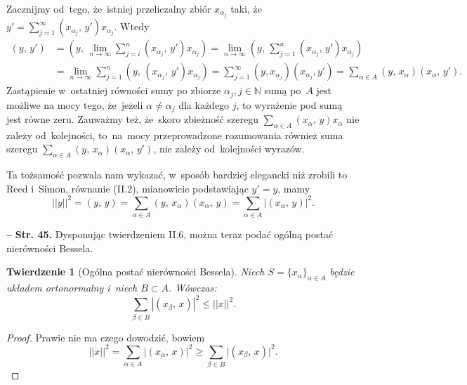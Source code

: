 \documentclass[a4paper,11pt]{article}
\newtheorem{twr}{Twierdzenie}
\newcommand{\spaceFour}{0.5em}
\newcommand{\mb}{\mathbb}
\newcommand{\ra}{\rightarrow}
\newcommand{\al}{\alpha}
\newcommand{\be}{\beta}
\newcommand{\N}{\mb{N}}
\newcommand{\subs}{\subset}
\newcommand{\Lim}{\lim\limits}
\newcommand{\Sum}{\sum\limits}
\providecommand{\absj}[1]{\lvert #1 \rvert}
\providecommand{\absd}[1]{\left| #1 \right|}
\providecommand{\absd}[1]{\left| \, #1 \, \right|}
\newcommand{\norm}[1]{\left|\left| #1 \right|\right|}
\newcommand{\tb}{\textbf}
\newcommand{\noi}{\noindent}
\newcommand{\start}{\noi \tb{--} {}}
\newcommand{\Str}[1]{\tb{Str. #1.}}
\newcommand{\SP}[2]{( #1, \, #2 )} %
\begin{document}
Zacznijmy od~tego, że~istniej przeliczalny zbiór $x_{ \al_{ j } }$
taki,
że~$y' = \Sum_{ j = 1 }^{ \infty } \SP{ x_{ \al_{ j } } }{ y' } x_{
  \al_{ j } }$. Wtedy
\begin{equation*}
  \begin{split}
    \SP{ y }{ y' } &= \SP{ y }{ \Lim_{ n \ra \infty } \Sum_{ j = i }^{
        n } \SP{ x_{ \al_{ j } } }{ y' } x_{ \al_{ j } } } = \Lim_{ n
      \ra \infty } \SP{ y }{ \Sum_{ j = 1 }^{ n } \SP{ x_{ \al_{ j } }
      }
      { y' } x_{ \al_{ j } } } \\
    &= \Lim_{ n \ra \infty } \Sum_{ j = 1 }^{ n } \SP{ y }{ \SP{ x_{
          \al_{ j } } }{ y' } x_{ \al_{ j } } } = \sum_{ j = 1 }^{
      \infty } ( y, x_{ \al_{ j } } ) ( x_{ \al_{ j } }, y' ) = \Sum_{
      \al \in A } \SP{ y }{ x_{ \al } } \SP{ x_{ \al } }{ y' }.
  \end{split}
\end{equation*}
Zastąpienie w~ostatniej równości sumy po zbiorze
$\alpha_{ j }, j \in \N$ sumą po~$A$ jest możliwe na mocy tego,
że~jeżeli $\alpha \neq \alpha_{ j }$ dla każdego $j$, to wyrażenie pod
sumą jest równe zeru. Zauważmy też, że~skoro zbieżność szeregu
$\sum_{ \al \in A } \SP{ x_{ \al } }{ y } x_{ \al }$ nie zależy
od~kolejności, to~na~mocy przeprowadzone rozumowania również suma
szeregu
$\sum_{ \al \in A } \SP{ y }{ x_{ \al } } \SP{ x_{ \al } }{ y' }$, nie
zależy od~kolejności wyrazów.

Ta tożsamość pozwala nam wykazać, w~sposób bardziej elegancki niż
zrobili to Reed i~Simon, równanie (II.2), mianowicie podstawiając
$y' = y$, mamy
\begin{equation*}
  \norm{ y }^{ 2 } = \SP{ y }{ y } = \Sum_{ \al \in A } \SP{ y }{ x_{ \al } }
  \SP{ x_{ \al } }{ y } = \Sum_{ \al \in A } \absj{ \SP{ x_{ \al } }{ y } }^{ 2 }.
\end{equation*}

\vspace{\spaceFour}


\start \Str{45} Dysponując twierdzeniem II.6, można teraz podać ogólną
postać nierówności Bessela.

\begin{twr}[Ogólna postać nierówności Bessela]
  Niech $S = \{ x_{ \al } \}_{ \al \in A }$ będzie układem
  ortonormalny i~niech $B \subs A$. Wówczas:
  \begin{equation*}
    \Sum_{ \be \in B } \absd{ \SP{ x_{ \be }}{ x } }^{ 2 } \leq \norm{ x }^{ 2 }.
  \end{equation*}
\end{twr}
\begin{proof}
  Prawie nie ma czego dowodzić, bowiem
  \begin{equation*}
    \norm{ x }^{ 2 } = \Sum_{ \al \in A } \absd{ \SP{ x_{ \al } }{ x } }^{ 2 }
    \geq \Sum_{ \be \in B } \absj{ \SP{ x_{ \be }}{ x } }^{ 2 }.
  \end{equation*}
\end{proof}
\end{document}
